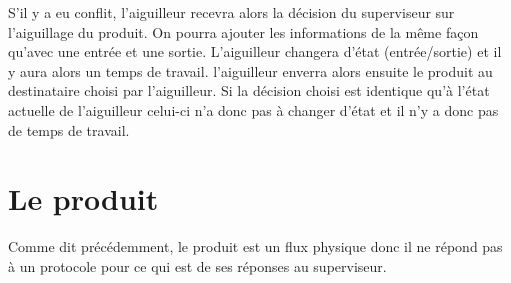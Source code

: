 	S'il y a eu conflit, l'aiguilleur recevra alors la décision du superviseur sur l'aiguillage du produit. On pourra ajouter les informations de la même façon qu'avec une entrée et une sortie. L'aiguilleur changera d'état (entrée/sortie) et il y aura alors un temps de travail. l'aiguilleur enverra alors ensuite le produit au destinataire choisi par l'aiguilleur. Si la décision choisi est identique qu'à l'état actuelle de l'aiguilleur celui-ci n'a donc pas à changer d'état et il n'y a donc pas de temps de travail.
	
	
	 
	 \section{Le produit}
	 
	 Comme dit précédemment, le produit est un flux physique donc il ne répond pas à un protocole pour ce qui est de ses réponses au superviseur. 
	 
